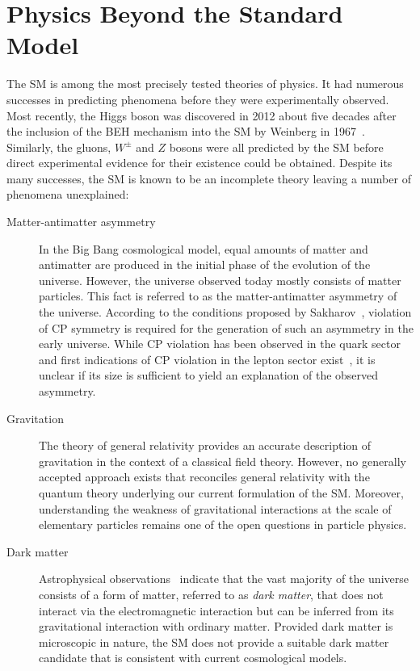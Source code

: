 \section{Physics Beyond the Standard Model}

The SM is among the most precisely tested theories of physics. It had numerous
successes in predicting phenomena before they were experimentally observed. Most
recently, the Higgs boson was discovered in 2012 about five decades after the
inclusion of the BEH mechanism into the SM by Weinberg in
1967~\cite{Weinberg:1967tq}. Similarly, the gluons, $W^\pm$ and $Z$ bosons were
all predicted by the SM before direct experimental evidence for their existence
could be obtained. Despite its many successes, the SM is known to be an
incomplete theory leaving a number of phenomena unexplained:
\begin{description}

\item[Matter-antimatter asymmetry] In the Big Bang cosmological model, equal
  amounts of matter and antimatter are produced in the initial phase of the
  evolution of the universe. However, the universe observed today mostly
  consists of matter particles. This fact is referred to as the
  matter-antimatter asymmetry of the universe. According to the conditions
  proposed by Sakharov~\cite{Sakharov:1967dj}, violation of CP symmetry is
  required for the generation of such an asymmetry in the early universe. While
  CP violation has been observed in the quark sector~\cite{Christenson:1964fg}
  and first indications of CP violation in the lepton sector
  exist~\cite{T2K:2019bcf}, it is unclear if its size is sufficient to yield an
  explanation of the observed asymmetry.

\item[Gravitation] The theory of general relativity provides an accurate
  description of gravitation in the context of a classical field
  theory. However, no generally accepted approach exists that reconciles general
  relativity with the quantum theory underlying our current formulation of the
  SM. Moreover, understanding the weakness of gravitational interactions at the
  scale of elementary particles remains one of the open questions in particle
  physics.

\item[Dark matter] Astrophysical
  observations~\cite{Zwicky:1933gu,Zwicky:1937zza,Rubin:1970zza,Rubin:1980zd,Clowe:2006eq}
  indicate that the vast majority of the universe consists of a form of matter,
  referred to as \emph{dark matter}, that does not interact via the
  electromagnetic interaction but can be inferred from its gravitational
  interaction with ordinary matter. Provided dark matter is microscopic in
  nature, the SM does not provide a suitable dark matter candidate that is
  consistent with current cosmological models.


\end{description}
